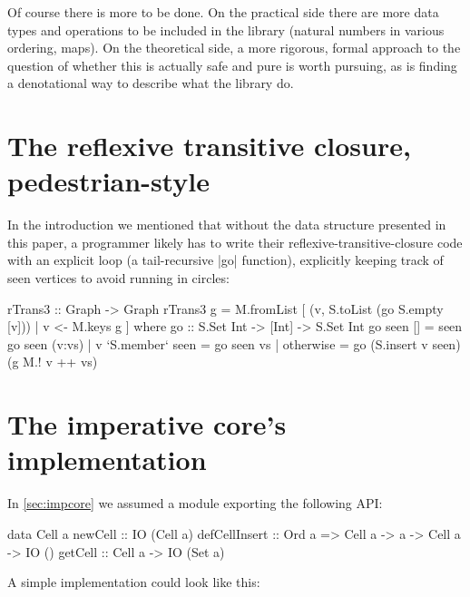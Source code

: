 \documentclass[manuscript,anonymous,screen,acmsmall]{acmart}
\begin{document}
Of course there is more to be done. On the practical side there are more data types and operations to be included in the library (natural numbers in various ordering, maps). On the theoretical side, a more rigorous, formal approach to the question of whether this is actually safe and pure is worth pursuing, as is finding a denotational way to describe what the library do.




\clearpage

\appendix
\section{The reflexive transitive closure, pedestrian-style}\label{sec:imp}

In the introduction we mentioned that without the data structure presented in this paper, a programmer likely has to write their reflexive-transitive-closure code with an explicit loop (a tail-recursive |go| function), explicitly keeping track of seen vertices to avoid running in circles:
\begin{code}
rTrans3 :: Graph -> Graph
rTrans3 g = M.fromList [ (v, S.toList (go S.empty [v])) | v <- M.keys g ]
  where
    go :: S.Set Int -> [Int] -> S.Set Int
    go seen [] = seen
    go seen (v:vs)  |  v `S.member` seen  =  go seen vs
                    |  otherwise          =  go (S.insert v seen) (g M.! v ++ vs)
\end{code}

\section{The imperative core's implementation}\label{sec:impcoreimpl}

In \cref{sec:impcore} we assumed a module exporting the following API:
\begin{code}
data Cell a
newCell        ::                                      IO (Cell a)
defCellInsert  ::  Ord a =>  Cell a -> a -> Cell a ->  IO ()
getCell        ::            Cell a ->                 IO (Set a)
\end{code}

\noindent 
A simple implementation could look like this:

\end{document}
